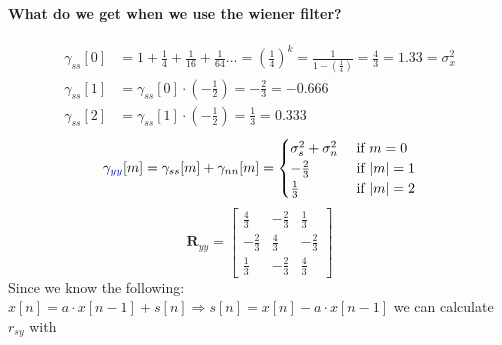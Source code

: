 \paragraph{What do we get when we use the wiener filter?}
$$
\begin{aligned}
\gamma_{ss}[0]&=1+\frac{1}{4}+\frac{1}{16}+\frac{1}{64}... = (\frac{1}{4})^k=\frac{1}{1-(\frac{1}{4})}=\frac{4}{3}=1.33=\sigma_x^2\\
\gamma_{ss}[1]&=\gamma_{ss}[0] \cdot (-\frac{1}{2})=-\frac{2}{3}=-0.666\\
\gamma_{ss}[2]&=\gamma_{ss}[1] \cdot (-\frac{1}{2})=\frac{1}{3}=0.333
\end{aligned}
$$
$$
\gamma_{\textcolor{blue}{y y}}[m]=\gamma_{s s}[m]+\gamma_{n n}[m]= \begin{cases}\sigma_s^2+\sigma_n^2 & \text { if } m=0 \\ -\frac{2}{3} & \text { if } |m| =1 \\ \frac{1}{3} & \text { if }  |m| =2 \end{cases}
$$
$$
\textbf{R}_{yy}=\begin{bmatrix}
\frac{4}{3} & -\frac{2}{3} & \frac{1}{3}\\
-\frac{2}{3} & \frac{4}{3} & -\frac{2}{3}\\
\frac{1}{3} & -\frac{2}{3} & \frac{4}{3}
\end{bmatrix}
$$
Since we know the following: $x[n]=a\cdot x[n-1]+s[n] \Rightarrow s[n]=x[n]-a\cdot x[n-1]$ we can calculate $r_{sy}$ with 
